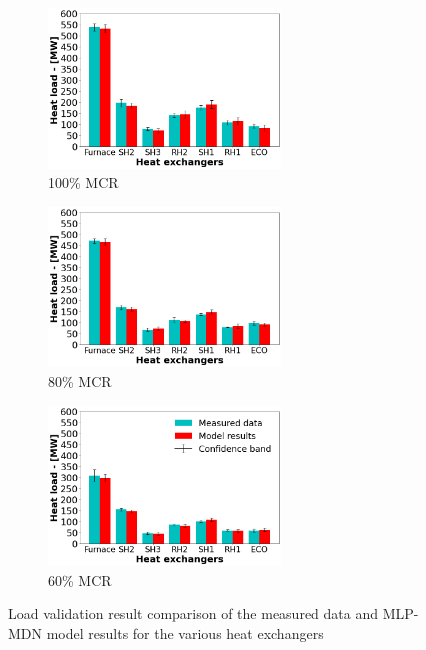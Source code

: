\documentclass[a4paper,fleqn]{cas-sc}
\begin{document}
\begin{figure}
\centering
\begin{subfigure}{0.33\textwidth}
    \includegraphics[width=\textwidth, height = 4.25cm]{100_CASE}
    \caption{100\% MCR}
\end{subfigure}\hfill %
\begin{subfigure}{0.33\textwidth}
    \includegraphics[width=\linewidth, height = 4.25cm]{80_CASE}
    \caption{80\% MCR}
\end{subfigure}\hfill
\begin{subfigure}{0.33\textwidth}
	\includegraphics[width=\linewidth, height = 4.25cm]{60_CASE}
        \caption{60\% MCR}
\end{subfigure}
\caption{Load validation result comparison of the measured data and MLP-MDN model results for the various heat exchangers}
\label{fig_heat_load}
\end{figure}
\end{document}
